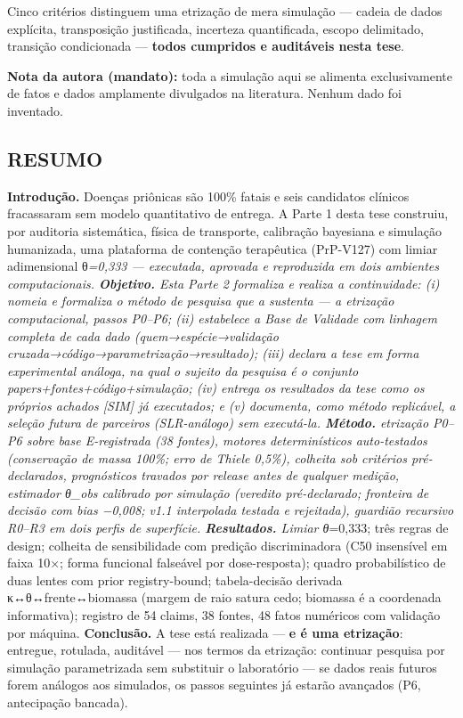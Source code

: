 \documentclass[
  10pt,
]{article}
\begin{document}
Cinco critérios distinguem uma etrização de mera simulação --- cadeia de
dados explícita, transposição justificada, incerteza quantificada,
escopo delimitado, transição condicionada --- \textbf{todos cumpridos e
auditáveis nesta tese}.

\textbf{Nota da autora (mandato):} toda a simulação aqui se alimenta
exclusivamente de fatos e dados amplamente divulgados na literatura.
Nenhum dado foi inventado.

\hypertarget{resumo}{%
\subsection{RESUMO}\label{resumo}}

\textbf{Introdução.} Doenças priônicas são 100\% fatais e seis
candidatos clínicos fracassaram sem modelo quantitativo de entrega. A
Parte 1 desta tese construiu, por auditoria sistemática, física de
transporte, calibração bayesiana e simulação humanizada, uma plataforma
de contenção terapêutica (PrP-V127) com limiar adimensional
θ\emph{=0,333 --- executada, aprovada e reproduzida em dois ambientes
computacionais. \textbf{Objetivo.} Esta Parte 2 formaliza e realiza a
continuidade: (i) nomeia e formaliza o método de pesquisa que a sustenta
--- a etrização computacional, passos P0--P6; (ii) estabelece a Base de
Validade com linhagem completa de cada dado (quem→espécie→validação
cruzada→código→parametrização→resultado); (iii) declara a tese em forma
experimental análoga, na qual o sujeito da pesquisa é o conjunto
papers+fontes+código+simulação; (iv) entrega os resultados da tese como
os próprios achados {[}SIM{]} já executados; e (v) documenta, como
método replicável, a seleção futura de parceiros (SLR-análogo) sem
executá-la. \textbf{Método.} etrização P0--P6 sobre base E-registrada
(38 fontes), motores determinísticos auto-testados (conservação de massa
100\%; erro de Thiele 0,5\%), colheita sob critérios pré-declarados,
prognósticos travados por release antes de qualquer medição, estimador
θ\_obs calibrado por simulação (veredito pré-declarado; fronteira de
decisão com bias −0,008; v1.1 interpolada testada e rejeitada), guardião
recursivo R0--R3 em dois perfis de superfície. \textbf{Resultados.}
Limiar θ}=0,333; três regras de design; colheita de sensibilidade com
predição discriminadora (C50 insensível em faixa 10×; forma funcional
falseável por dose-resposta); quadro probabilístico de duas lentes com
prior registry-bound; tabela-decisão derivada κ↔θ↔frente↔biomassa
(margem de raio satura cedo; biomassa é a coordenada informativa);
registro de 54 claims, 38 fontes, 48 fatos numéricos com validação por
máquina. \textbf{Conclusão.} A tese está realizada --- \textbf{e é uma
etrização}: entregue, rotulada, auditável --- nos termos da etrização:
continuar pesquisa por simulação parametrizada sem substituir o
laboratório --- se dados reais futuros forem análogos aos simulados, os
passos seguintes já estarão avançados (P6, antecipação bancada).
\end{document}
